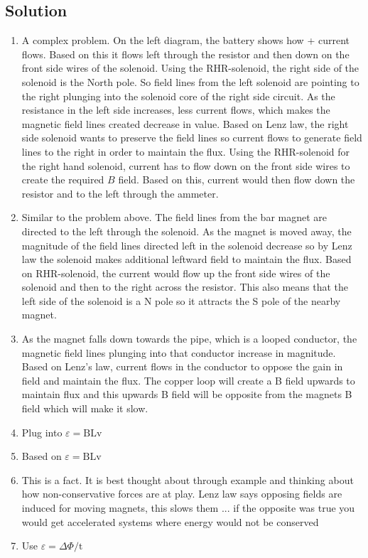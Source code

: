 \begin{enumerate}
\section*{Solution}
\begin{enumerate}
  \item A complex problem. On the left diagram, the battery shows how + current flows. Based on this it flows left through the resistor and then down on the front side wires of the solenoid. Using the RHR-solenoid, the right side of the solenoid is the North pole. So field lines from the left solenoid are pointing to the right plunging into the solenoid core of the right side circuit. As the resistance in the left side increases, less current flows, which makes the magnetic field lines created decrease in value. Based on Lenz law, the right side solenoid wants to preserve the field lines so current flows to generate field lines to the right in order to maintain the flux. Using the RHR-solenoid for the right hand solenoid, current has to flow down on the front side wires to create the required $B$ field. Based on this, current would then flow down the resistor and to the left through the ammeter.
  \item Similar to the problem above. The field lines from the bar magnet are directed to the left through the solenoid. As the magnet is moved away, the magnitude of the field lines directed left in the solenoid decrease so by Lenz law the solenoid makes additional leftward field to maintain the flux. Based on RHR-solenoid, the current would flow up the front side wires of the solenoid and then to the right across the resistor. This also means that the left side of the solenoid is a N pole so it attracts the S pole of the nearby magnet.
  \item As the magnet falls down towards the pipe, which is a looped conductor, the magnetic field lines plunging into that conductor increase in magnitude. Based on Lenz's law, current flows in the conductor to oppose the gain in field and maintain the flux. The copper loop will create a B field upwards to maintain flux and this upwards B field will be opposite from the magnets B field which will make it slow.
  \item Plug into $\varepsilon=\mathrm{BLv}$
  \item Based on $\varepsilon=\mathrm{BLv}$
  \item This is a fact. It is best thought about through example and thinking about how non-conservative forces are at play. Lenz law says opposing fields are induced for moving magnets, this slows them ... if the opposite was true you would get accelerated systems where energy would not be conserved
  \item Use $\varepsilon=\Delta \Phi / \mathrm{t}$
\end{enumerate}


\end{enumerate}
